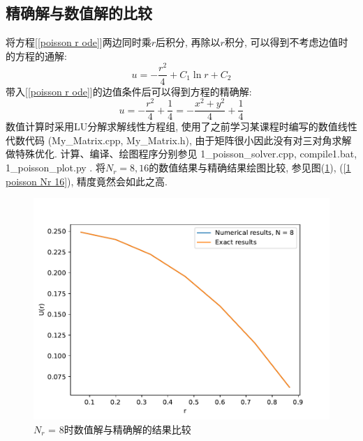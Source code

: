 \documentclass[a4paper,zihao=5,UTF8]{ctexart}
\begin{document}
	\subsection{精确解与数值解的比较}
	将方程[\ref{poisson r ode}]两边同时乘$r$后积分, 再除以$r$积分, 可以得到不考虑边值时的方程的通解:
	\begin{equation}
		u = -\frac{r^2}{4} + C_1\ln r + C_2
	\end{equation}
	带入[\ref{poisson r ode}]的边值条件后可以得到方程的精确解:
	\begin{equation}
		u = -\frac{r^2}{4} + \frac{1}{4} = -\frac{x^2 + y^2}{4} + \frac{1}{4}
	\end{equation}
	数值计算时采用LU分解求解线性方程组, 使用了之前学习某课程时编写的数值线性代数代码
	(My\_Matrix.cpp, My\_Matrix.h), 由于矩阵很小因此没有对三对角求解做特殊优化. 
	计算、编译、绘图程序分别参见 1\_poisson\_solver.cpp, compile1.bat, 1\_poisson\_plot.py
	. 将$N_r = 8, 16$的数值结果与精确结果绘图比较, 参见图(\ref{1 poisson Nr 8}), (\ref{1 poisson Nr 16}), 精度竟然会如此之高.
	\begin{figure}[htbp]
		\centering
		\includegraphics[scale=0.7]{1_poisson_Nr_8.pdf}
		\caption{$N_r$ = 8时数值解与精确解的结果比较}
		\label{1 poisson Nr 8}
	\end{figure}
\end{document}
